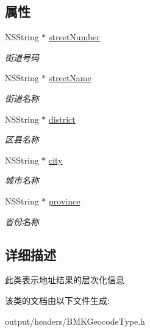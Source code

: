 \subsection*{属性}
\begin{DoxyCompactItemize}
\item 
\hypertarget{interface_b_m_k_address_component_a7a9e0a709b4969472aa1b17a042975c8}{}N\+S\+String $\ast$ \hyperlink{interface_b_m_k_address_component_a7a9e0a709b4969472aa1b17a042975c8}{street\+Number}\label{interface_b_m_k_address_component_a7a9e0a709b4969472aa1b17a042975c8}

\begin{DoxyCompactList}\small\item\em 街道号码 \end{DoxyCompactList}\item 
\hypertarget{interface_b_m_k_address_component_afef3697cbdab210a40b85a4d628aa6b8}{}N\+S\+String $\ast$ \hyperlink{interface_b_m_k_address_component_afef3697cbdab210a40b85a4d628aa6b8}{street\+Name}\label{interface_b_m_k_address_component_afef3697cbdab210a40b85a4d628aa6b8}

\begin{DoxyCompactList}\small\item\em 街道名称 \end{DoxyCompactList}\item 
\hypertarget{interface_b_m_k_address_component_a3bb4c8b38bef483378a4ed4e0ec33aaa}{}N\+S\+String $\ast$ \hyperlink{interface_b_m_k_address_component_a3bb4c8b38bef483378a4ed4e0ec33aaa}{district}\label{interface_b_m_k_address_component_a3bb4c8b38bef483378a4ed4e0ec33aaa}

\begin{DoxyCompactList}\small\item\em 区县名称 \end{DoxyCompactList}\item 
\hypertarget{interface_b_m_k_address_component_ad7a30c029e65d37d09d106ca5cb55d1b}{}N\+S\+String $\ast$ \hyperlink{interface_b_m_k_address_component_ad7a30c029e65d37d09d106ca5cb55d1b}{city}\label{interface_b_m_k_address_component_ad7a30c029e65d37d09d106ca5cb55d1b}

\begin{DoxyCompactList}\small\item\em 城市名称 \end{DoxyCompactList}\item 
\hypertarget{interface_b_m_k_address_component_a849d581c8eaa3447b9aaa1764f7ac85c}{}N\+S\+String $\ast$ \hyperlink{interface_b_m_k_address_component_a849d581c8eaa3447b9aaa1764f7ac85c}{province}\label{interface_b_m_k_address_component_a849d581c8eaa3447b9aaa1764f7ac85c}

\begin{DoxyCompactList}\small\item\em 省份名称 \end{DoxyCompactList}\end{DoxyCompactItemize}


\subsection{详细描述}
此类表示地址结果的层次化信息 

该类的文档由以下文件生成\+:\begin{DoxyCompactItemize}
\item 
output/headers/B\+M\+K\+Geocode\+Type.\+h\end{DoxyCompactItemize}
